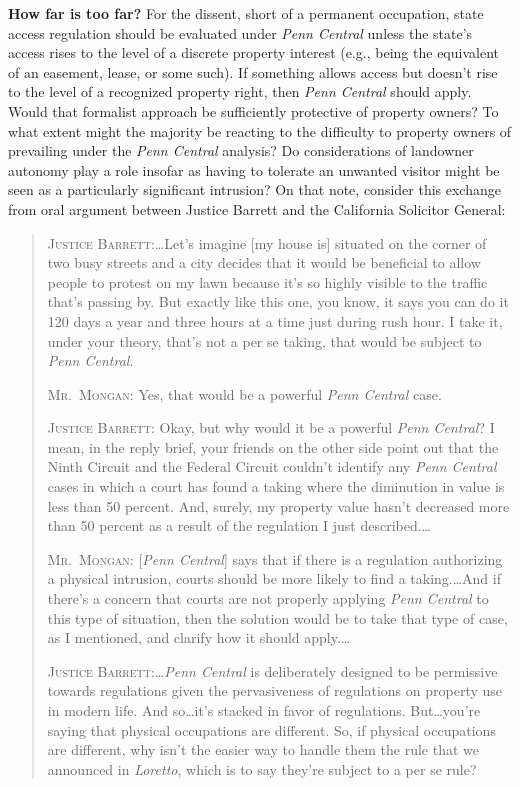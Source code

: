 \item \textbf{How far is too far?} For the dissent, short of a permanent
occupation, state access regulation should be evaluated under \textit{Penn
Central} unless the state's access rises to the level of a discrete property
interest (e.g., being the equivalent of an easement, lease, or some such). If
something allows access but doesn't rise to the level of a recognized property
right, then \textit{Penn Central} should apply. Would that formalist approach be
sufficiently protective of property owners? To what extent might the majority be
reacting to the difficulty to property owners of prevailing under the
\textit{Penn Central} analysis? Do considerations of landowner autonomy play a
role insofar as having to tolerate an unwanted visitor might be seen as a
particularly significant intrusion? On that note, consider this exchange from
oral argument between Justice Barrett and the California Solicitor General:
\begin{quotation}
\textsc{Justice Barrett}:\ldots Let's imagine [my house is] situated on the
corner of two busy streets and a city decides that it would be beneficial to
allow people to protest on my lawn because it's so highly visible to the traffic
that's passing by. But exactly like this one, you know, it says you can do it
120 days a year and three hours at a time just during rush hour. I take it,
under your theory, that's not a per se taking, that would be subject to
\emph{Penn Central}. 

\textsc{Mr.~Mongan}: Yes, that would be a powerful \emph{Penn Central} case.

\textsc{Justice Barrett}: Okay, but why would it be a powerful \emph{Penn
Central}? I mean, in the reply brief, your friends on the other side point out
that the Ninth Circuit and the Federal Circuit couldn't identify any \emph{Penn
Central} cases in which a court has found a taking where the diminution in value
is less than 50 percent. And, surely, my property value hasn't decreased more
than 50 percent as a result of the regulation I just described.\ldots

\textsc{Mr.~Mongan}: [\emph{Penn Central}] says that if there is a regulation
authorizing a physical intrusion, courts should be more likely to find a
taking.\ldots And if there's a concern that courts are not properly applying
\emph{Penn Central} to this type of situation, then the solution would be to
take that type of case, as I mentioned, and clarify how it should apply.\ldots

\textsc{Justice Barrett}:\ldots \emph{Penn Central} is deliberately designed to
be permissive towards regulations given the pervasiveness of regulations on
property use in modern life. And so\ldots it's stacked in favor of regulations.
But\ldots you're saying that physical occupations are different. So, if physical
occupations are different, why isn't the easier way to handle them the rule that
we announced in \emph{Loretto}, which is to say they're subject to a per se
rule?
\end{quotation}

